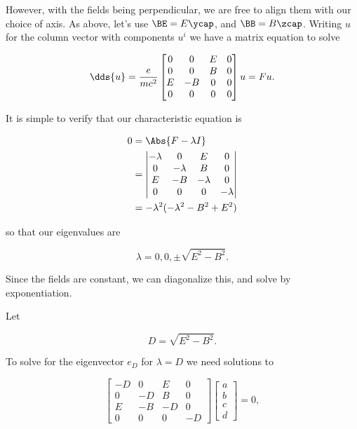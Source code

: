 However, with the fields being perpendicular, we are free to align them with our choice of axis.  As above, let's use $\BE = E \ycap$, and $\BB = B \zcap$.  Writing $u$ for the column vector with components $u^i$ we have a matrix equation to solve

\begin{equation}\label{eqn:relElectroDynProblemSet2:530}
\dds{u} = 
\frac{ e }{m c^2}
\begin{bmatrix}
0 & 0 & E & 0 \\
0 & 0 & B & 0 \\
E & -B & 0 & 0 \\
0 & 0 & 0 & 0
\end{bmatrix} u = F u.
\end{equation}

It is simple to verify that our characteristic equation is

\begin{align*}
0 
&= \Abs{ F - \lambda I } \\
&= \begin{vmatrix}
-\lambda & 0 & E & 0 \\
0 & -\lambda & B & 0 \\
E & -B & -\lambda & 0 \\
0 & 0 & 0 & -\lambda
\end{vmatrix} \\
&= -\lambda^2 ( -\lambda^2 - B^2 + E^2 )
\end{align*}

so that our eigenvalues are

\begin{equation}\label{eqn:relElectroDynProblemSet2:550}
\lambda = 0, 0, \pm \sqrt{E^2 - B^2}.
\end{equation}

Since the fields are constant, we can diagonalize this, and solve by exponentiation.

Let 

\begin{equation}\label{eqn:relElectroDynProblemSet2:570}
D = \sqrt{E^2 - B^2}.
\end{equation}

To solve for the eigenvector $e_D$ for $\lambda = D$ we need solutions to

\begin{equation}\label{eqn:relElectroDynProblemSet2:590}
\begin{bmatrix}
-D & 0 & E & 0 \\
0 & -D & B & 0 \\
E & -B & -D & 0 \\
0 & 0 & 0 & -D
\end{bmatrix} 
\begin{bmatrix} 
a \\
b \\
c \\
d
\end{bmatrix} 
 = 0,
\end{equation}

